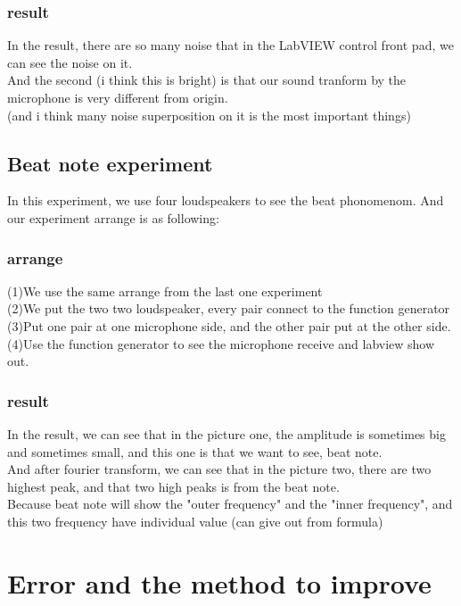 \documentclass[12pt]{article}
\begin{document}
\subsubsection{result}
In the result, there are so many noise that in the LabVIEW control front pad, we can see the noise on it.\\
And the second (i think this is bright) is that our sound tranform by the microphone is very different from origin.\\ 
(and i think many noise superposition on it is the most important things)\\
  

\subsection{Beat note experiment}
In this experiment, we use four loudspeakers to see the beat phonomenom.
And our experiment arrange is as following:\\ 
\subsubsection{arrange}
(1)We use the same arrange from the last one experiment\\
(2)We put the two two loudspeaker, every pair connect to the function generator\\
(3)Put one pair at one microphone side, and the other pair put at the other side.\\
(4)Use the function generator to see the microphone receive and labview show out.\\





\subsubsection{result}
In the result, we can see that in the picture one, the amplitude is sometimes big and sometimes small, and this one is that we want to see, beat note.\\
And after fourier transform, we can see that in the picture two, there are two highest peak, and that two high peaks is from the beat note.\\
Because beat note will show the "outer frequency" and the "inner frequency", and this two frequency have individual value (can give out from formula)\



\section{Error and the method to improve}
\end{document}
